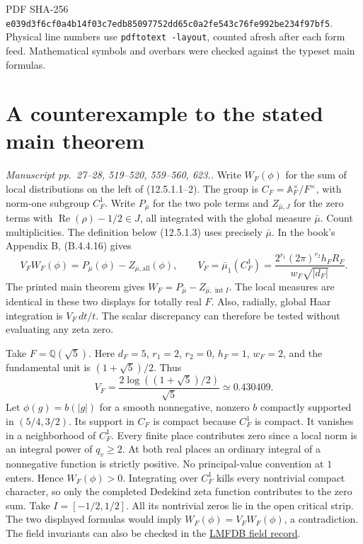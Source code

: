 \documentclass[11pt,letterpaper]{article}
\newcommand{\Q}{\mathbb Q}
\newcommand{\A}{\mathbb A}
\newcommand{\re}{\operatorname{Re}}
\newcommand{\loc}[1]{\textit{Manuscript #1.}}
\begin{document}
{\small PDF SHA-256\\ \texttt{e039d3f6cf0a4b14f03c7edb85097752dd65c0a2fe543c76fe992be234f97bf5}.\\ Physical line numbers use \texttt{pdftotext -layout}, counted afresh after each form feed. Mathematical symbols and overbars were checked against the typeset main formulas.}

\begingroup
\small
\setlength{\parskip}{1pt}
\makeatletter
\renewcommand*\l@section{\@dottedtocline{1}{0em}{1.8em}}
\makeatother
\tableofcontents
\endgroup
\clearpage

\section{A counterexample to the stated main theorem}\label{sec:volume}

\loc{pp.~27--28, 519--520, 559--560, 623.}
Write $W_F(\phi)$ for the sum of local distributions on the left of (12.5.1.1--2). The group is $C_F=\A_F^\times/F^\times$, with norm-one subgroup $C_F^1$. Write $P_{\bar\mu}$ for the two pole terms and $Z_{\bar\mu,J}$ for the zero terms with $\re(\rho)-1/2\in J$, all integrated with the global measure $\bar\mu$. Count multiplicities. The definition below (12.5.1.3) uses precisely $\bar\mu$. In the book's Appendix B, (B.4.4.16) gives
\[
 V_F W_F(\phi)=P_{\bar\mu}(\phi)-Z_{\bar\mu,\mathrm{all}}(\phi),
 \qquad
 V_F=\bar\mu_1(C_F^1)=
 \frac{2^{r_1}(2\pi)^{r_2}h_FR_F}{w_F\sqrt{|d_F|}} .
\]
The printed main theorem gives $W_F=P_{\bar\mu}-Z_{\bar\mu,\operatorname{int} I}$. The local measures are identical in these two displays for totally real $F$. Also, radially, global Haar integration is $V_F\,dt/t$. The scalar discrepancy can therefore be tested without evaluating any zeta zero.

Take $F=\Q(\sqrt 5)$. Here $d_F=5$, $r_1=2$, $r_2=0$, $h_F=1$, $w_F=2$, and the fundamental unit is $(1+\sqrt5)/2$. Thus
\[
 V_F=\frac{2\log((1+\sqrt5)/2)}{\sqrt5}\simeq 0.430409 .
\]
Let $\phi(g)=b(|g|)$ for a smooth nonnegative, nonzero $b$ compactly supported in $(5/4,3/2)$. Its support in $C_F$ is compact because $C_F^1$ is compact. It vanishes in a neighborhood of $C_F^1$. Every finite place contributes zero since a local norm is an integral power of $q_v\ge2$. At both real places an ordinary integral of a nonnegative function is strictly positive. No principal-value convention at $1$ enters. Hence $W_F(\phi)>0$. Integrating over $C_F^1$ kills every nontrivial compact character, so only the completed Dedekind zeta function contributes to the zero sum. Take $I=[-1/2,1/2]$. All its nontrivial zeros lie in the open critical strip. The two displayed formulas would imply $W_F(\phi)=V_FW_F(\phi)$, a contradiction. The field invariants can also be checked in the \href{https://www.lmfdb.org/NumberField/2.2.5.1}{LMFDB field record}.
\end{document}
